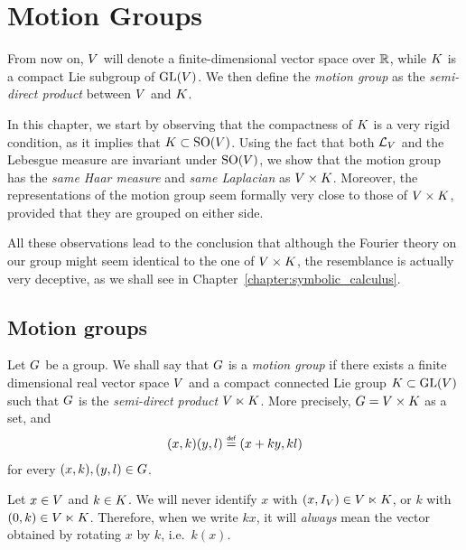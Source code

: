 \chapter{Motion Groups}

From now on,
$\VectorSpace$ will denote a finite-dimensional vector space over $\R$,
while $\CompactGroup$ is a compact Lie subgroup of $\GeneralLinear\VectorSpace$.
We then define the \emph{motion group} as the \emph{semi-direct product} between $\VectorSpace$ and $\CompactGroup$.

In this chapter,
we start by observing that the compactness of $\CompactGroup$ is a very rigid condition,
as it implies that $\CompactGroup \subset \SpecialOrthogonalGroup \VectorSpace$.
Using the fact that both $\Laplacian [\VectorSpace]$ and the Lebesgue measure are invariant under $\SpecialOrthogonalGroup \VectorSpace$,
we show that the motion group has the \emph{same Haar measure} and \emph{same Laplacian} as $\GroupDirect$.
Moreover,
the representations of the motion group seem formally very close to those of $\GroupDirect$, provided that they are grouped on either side.

All these observations lead to the conclusion
that although the Fourier theory on our group might seem identical to the one of $\GroupDirect$,
the resemblance is actually very deceptive,
as we shall see in Chapter~\ref{chapter:symbolic_calculus}.

\section{Motion groups}

\begin{definition}
\label{definition:motion_group}
    Let $\Group$ be a group.
    We shall say that $\Group$ is a \emph{motion group}
    if there exists a finite dimensional real vector space $\VectorSpace$
    and a compact connected Lie group $\CompactGroup \subset \GeneralLinear\VectorSpace$
    such that $\Group$ is the \emph{semi-direct product} $\VectorSpace \ltimes \CompactGroup$.
    More precisely, $\Group = \VectorSpace \times \CompactGroup$ as a set, and
    \begin{align*}
        (x, k) (y, l) \defeq (x + ky, k l)
    \end{align*}
    for every $(x, k), (y, l) \in \Group$.
\end{definition}

\begin{remark}
\label{remark:notation_kx}
    Let $x \in \VectorSpace$ and $k \in \CompactGroup$.
    We will never identify $x$ with $(x, \Id{\VectorSpace}) \in \VectorSpace \ltimes \CompactGroup$,
    or $k$ with $(0, k) \in \VectorSpace \ltimes \CompactGroup$.
    Therefore, when we write $k x$, it will \emph{always} mean the vector obtained by rotating $x$ by $k$, i.e.\ $k(x)$.
\end{remark}

